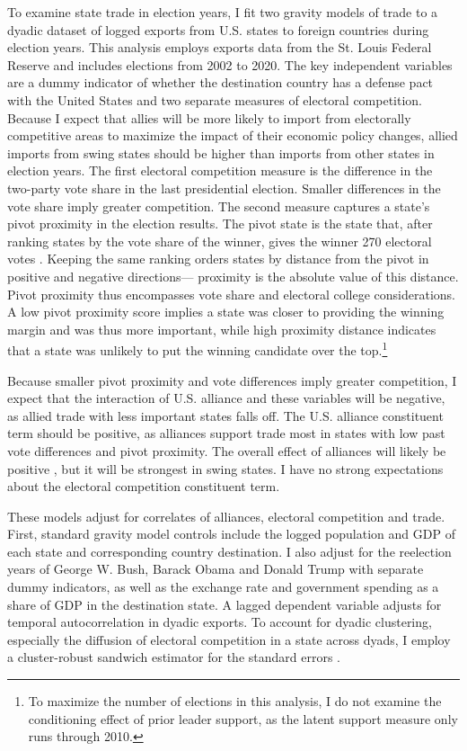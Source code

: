 \documentclass[12pt]{article}
\begin{document}
To examine state trade in election years, I fit two gravity models of trade to a dyadic dataset of logged exports from U.S. states to foreign countries during election years.
This analysis employs exports data from the St. Louis Federal Reserve and includes elections from 2002 to 2020.
The key independent variables are a dummy indicator of whether the destination country has a defense pact with the United States and two separate measures of electoral competition. 
Because I expect that allies will be more likely to import from electorally competitive areas to maximize the impact of their economic policy changes, allied imports from swing states should be higher than imports from other states in election years. 
The first electoral competition measure is the difference in the two-party vote share in the last presidential election.
Smaller differences in the vote share imply greater competition.
The second measure captures a state's pivot proximity in the election results. 
The pivot state is the state that, after ranking states by the vote share of the winner, gives the winner 270 electoral votes \citep{Wright2009}.
Keeping the same ranking orders states by distance from the pivot in positive and negative directions--- proximity is the absolute value of this distance. 
Pivot proximity thus encompasses vote share and electoral college considerations. 
A low pivot proximity score implies a state was closer to providing the winning margin and was thus more important, while high proximity distance indicates that a state was unlikely to put the winning candidate over the top.\footnote{To maximize the number of elections in this analysis, I do not examine the conditioning effect of prior leader support, as the latent support measure only runs through 2010.} 


Because smaller pivot proximity and vote differences imply greater competition, I expect that the interaction of U.S. alliance and these variables will be negative, as allied trade with less important states falls off.
The U.S. alliance constituent term should be positive, as alliances support trade most in states with low past vote differences and pivot proximity.
The overall effect of alliances will likely be positive \citep{GowaMansfield2004, Fordham2010}, but it will be strongest in swing states. 
I have no strong expectations about the electoral competition constituent term.


These models adjust for correlates of alliances, electoral competition and trade.
First, standard gravity model controls include the logged population and GDP of each state and corresponding country destination. 
I also adjust for the reelection years of George W. Bush, Barack Obama and Donald Trump with separate dummy indicators, as well as the exchange rate and government spending as a share of GDP in the destination state. 
A lagged dependent variable adjusts for temporal autocorrelation in dyadic exports.
To account for dyadic clustering, especially the diffusion of electoral competition in a state across dyads, I employ a cluster-robust sandwich estimator for the standard errors \citep{Aronowetal2015}.
\end{document}
